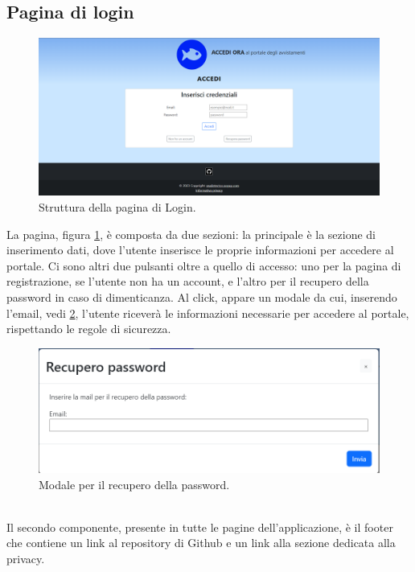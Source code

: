 \documentclass[a4paper,final,12pt]{report}
\begin{document}
\newpage

\subsection{Pagina di login}
\begin{figure}[hbtp]
\centering
\includegraphics[scale=0.31]{img_concettuale/login.png}
\caption{Struttura della pagina di Login.}
\label{figura:paglogin}
\end{figure}
La pagina, figura \ref{figura:paglogin}, è composta da due sezioni: la principale è la sezione di inserimento dati, dove l'utente inserisce le proprie informazioni per accedere al portale. Ci sono altri due pulsanti oltre a quello di accesso: uno per la pagina di registrazione, se l'utente non ha un account, e l'altro per il recupero della password in caso di dimenticanza. Al click, appare un modale da cui, inserendo l'email, vedi \ref{figura:recpass}, l'utente riceverà le informazioni necessarie per accedere al portale, rispettando le regole di sicurezza. 
\begin{figure}[hbtp]
\centering
\includegraphics[scale=0.42]{img_concettuale/recuperoPWD.png}
\caption{Modale per il recupero della password.}
\label{figura:recpass}
\end{figure}
\\Il secondo componente, presente in tutte le pagine dell'applicazione, è il footer che contiene un link al repository di Github e un link alla sezione dedicata alla privacy.
\end{document}

